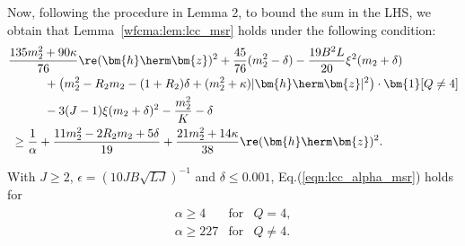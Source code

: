			Now, following the procedure in Lemma 2, to bound the sum in the LHS, we obtain that Lemma~\ref{wfcma:lem:lcc_msr} holds under the following condition:
			\begin{align}
				&\frac{135 m_2^2+90\kappa}{76}\re(\bm{h}\herm\bm{z})^2+\frac{45}{76}(m_2^2-\delta)-\frac{19B^2L}{20}\xi^2(  m_2+\delta)
				\nonumber\\&\qquad\quad
				+\big( m_2^2-R_2m_2-(1+R_2)\delta+(m_2^2+\kappa)|\bm{h}\herm\bm{z}|^2\big)\cdot\bm{1}[Q\neq 4]
				\nonumber\\&\qquad\quad
				-3(J-1)\xi(m_2+\delta)^2
				-\frac{m_2^2}{K}-\delta
				\nonumber\\
				&\;\geq  \frac{1}{\alpha}+\frac{11m_2^2-2R_2m_2+5\delta}{19} +   \frac{21m_2^2+14\kappa}{38}\re(\bm{h}\herm\bm{z})^2.\label{eqn:lcc_alpha_msr}
			\end{align}
			
			With $J\geq2$, $\epsilon=(10JB\sqrt{LJ})^{-1}$ and $\delta\leq0.001$, Eq.(\ref{eqn:lcc_alpha_msr}) holds for 
			\begin{align}
				\begin{array}{lcc}
					\alpha\geq 4&\text{for}&Q=4,\\
					\alpha\geq 227&\text{for}&Q\neq4.\\
				\end{array}	\nonumber
			\end{align} 
			
			
			
			
			
			
